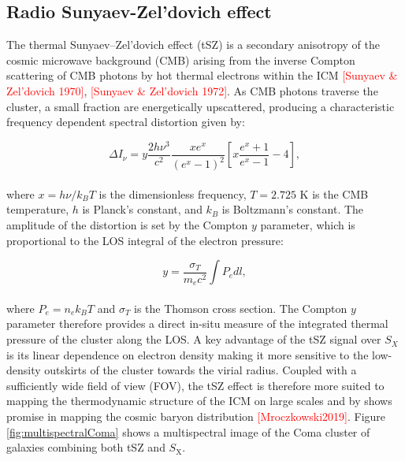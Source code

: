 \subsection{Radio Sunyaev-Zel’dovich effect}\label{Chap:scientificLandscapeObservablesRSZ}

The thermal Sunyaev--Zel'dovich effect (tSZ) is a secondary anisotropy of the cosmic microwave background (CMB)  arising from the inverse Compton scattering of CMB photons by hot thermal electrons within the ICM \textcolor{red}{[Sunyaev \& Zel'dovich 1970]}, \textcolor{red}{[Sunyaev \& Zel'dovich 1972]}. As CMB photons traverse the cluster, a small fraction are energetically upscattered, producing a characteristic frequency dependent spectral distortion  given by:

\begin{equation}
	\Delta I_{\nu} = y \frac{2 h \nu^{3}}{c^{2}} \frac{x e^{x}}{(e^{x} - 1)^{2}} \left[ x\frac{ e^{x} + 1   }{e^{x} - 1} - 4  \right],
	\label{eq:Distortion}
\end{equation}
\\
where $x = h\nu/k_BT$ is the dimensionless frequency, 
$T = 2.725$ K is the CMB temperature, $h$ is Planck's 
constant, and $k_B$ is Boltzmann's constant. The amplitude of the distortion is set by the Compton $y$ parameter, which is proportional to the LOS integral of the electron pressure:

\begin{equation}
	y = \frac{\sigma_{T}}{m_{e}c^{2}} \int P_{e} dl,
	\label{eq:comptony}
\end{equation}
\\
where $P_{e} = n_{e}k_{B}T$ and $\sigma_{T}$ is the Thomson cross section. The Compton $y$ parameter therefore provides a direct in-situ measure of the integrated thermal pressure of the cluster along the LOS. A key advantage of the tSZ signal over $S_{X}$ is its linear dependence on electron density making it more sensitive to the low-density outskirts of the cluster towards the virial radius. Coupled with a sufficiently wide field of view (FOV), the tSZ effect is therefore more suited to mapping the thermodynamic structure of the ICM on large scales and by shows promise in mapping the cosmic baryon distribution \textcolor{red}{[Mroczkowski2019]}. Figure \ref{fig:multispectralComa} shows a multispectral image of the Coma cluster of galaxies combining both tSZ and $S_{\mathrm{X}}$.

